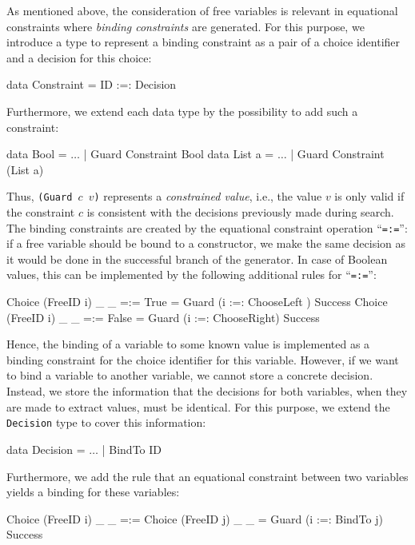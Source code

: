 \documentclass{llncs}
\newcommand{\code}[1]{\mbox{\small\texttt{#1}}}
\newcommand{\ccode}[1]{``\code{#1}''}
\begin{document}
As mentioned above, the consideration of free variables
is relevant in equational constraints where \emph{binding constraints} are
generated. For this purpose, we introduce a type to represent
a binding constraint as a pair of a choice identifier
and a decision for this choice:
\begin{haskell}
  data Constraint = ID :=: Decision
\end{haskell}
Furthermore, we extend each data type by the possibility to
add such a constraint:
\begin{haskell}
  data Bool   = $\ldots$ | Guard Constraint Bool
  data List a = $\ldots$ | Guard Constraint (List a)
\end{haskell}
Thus, \code{(Guard $c$ $v$)} represents a \emph{constrained value},
i.e., the value $v$ is only valid if the constraint $c$ is
consistent with the decisions previously made during search.
The binding constraints are created by the
equational constraint operation \ccode{=:=}: if a free variable
should be bound to a constructor, we make the same
decision as it would be done in the successful branch
of the generator. In case of Boolean values,
this can be implemented by the following additional rules
for \ccode{=:=}:
\begin{haskell}
  Choice (FreeID i) _ _ =:= True   =  Guard (i :=: ChooseLeft ) Success
  Choice (FreeID i) _ _ =:= False  =  Guard (i :=: ChooseRight) Success
\end{haskell}
Hence, the binding of a variable to some known value
is implemented as a binding constraint for the choice identifier
for this variable. However, if we want to bind a variable
to another variable, we cannot store a concrete decision.
Instead, we store the information that the decisions for
both variables, when they are made to extract values,
must be identical. For this purpose, we extend the \code{Decision}
type to cover this information:
\begin{haskell}
  data Decision = $\ldots$ | BindTo ID
\end{haskell}
Furthermore, we add the rule that an equational constraint
between two variables yields a binding for these variables:
\begin{haskell}
  Choice (FreeID i) _ _ =:= Choice (FreeID j) _ _
    =  Guard (i :=: BindTo j) Success
\end{haskell}
%
\end{document}
